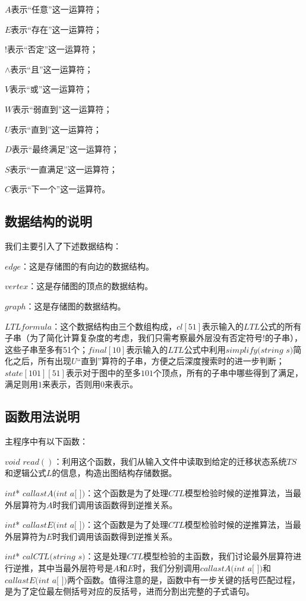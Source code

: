 \documentclass[UTF8]{ctexart}
\begin{document}
$A$表示“任意”这一运算符；

$E$表示“存在”这一运算符；

$!$表示“否定”这一运算符；

$\wedge$表示“且”这一运算符；

$V$表示“或”这一运算符；

$W$表示“弱直到”这一运算符；

$U$表示“直到”这一运算符；

$D$表示“最终满足”这一运算符；

$S$表示“一直满足”这一运算符；

$C$表示“下一个”这一运算符。

\subsection{数据结构的说明}
我们主要引入了下述数据结构：

$edge$：这是存储图的有向边的数据结构。

$vertex$：这是存储图的顶点的数据结构。

$graph$：这是存储图的数据结构。

$LTLformula$：这个数据结构由三个数组构成，$cl[51]$表示输入的$LTL$公式的所有子串（为了简化计算复杂度的考虑，我们只需考察最外层没有否定符号$!$的子串），这些子串至多有51个；$final[10]$表示输入的$LTL$公式中利用$simplify (string$ $s)$简化之后，所有出现$U$“直到”算符的子串，方便之后深度搜索时的进一步判断；$state[101][51]$表示对于图中的至多$101$个顶点，所有的子串中哪些得到了满足，满足则用$1$来表示，否则用$0$来表示。

\subsection{函数用法说明}
主程序中有以下函数：

$void$ $read()$：利用这个函数，我们从输入文件中读取到给定的迁移状态系统$TS$和逻辑公式$L$的信息，构造出图结构存储数据。

$int$* $callastA(int$ $a[$ $])$：这个函数是为了处理$CTL$模型检验时候的逆推算法，当最外层算符为$A$时我们调用该函数得到逆推关系。

$int$* $callastE(int$ $a[$ $])$：这个函数是为了处理$CTL$模型检验时候的逆推算法，当最外层算符为$E$时我们调用该函数得到逆推关系。

$int$* $calCTL(string$ $s)$：这是处理$CTL$模型检验的主函数，我们讨论最外层算符进行逆推，其中当最外层符号是$A$和$E$时，我们分别调用$callastA(int$ $a[$ $])$和 $callastE(int$ $a[$ $])$两个函数。值得注意的是，函数中有一步关键的括号匹配过程，是为了定位最左侧括号对应的反括号，进而分割出完整的子式语句。
\end{document}
